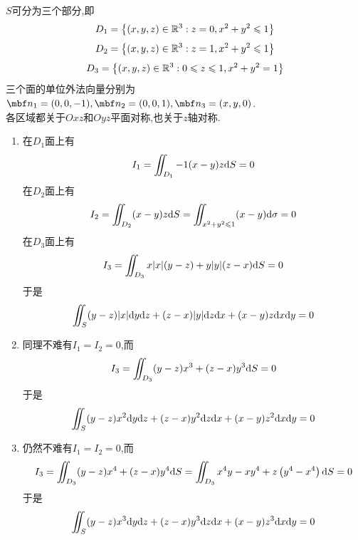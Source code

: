 \documentclass{ctexart}
\begin{document}
\begin{solution}
    $S$可分为三个部分,即
    \[D_1=\left\{(x,y,z)\in\mathbb{R}^3:z=0,x^2+y^2\leqslant1\right\}\]
    \[D_2=\left\{(x,y,z)\in\mathbb{R}^3:z=1,x^2+y^2\leqslant1\right\}\]
    \[D_3=\left\{(x,y,z)\in\mathbb{R}^3:0\leqslant z\leqslant 1,x^2+y^2=1\right\}\]
    三个面的单位外法向量分别为$\mbf n_1=(0,0,-1),\mbf n_2=(0,0,1),\mbf n_3=(x,y,0)$.\\
    各区域都关于$Oxz$和$Oyz$平面对称,也关于$z$轴对称.
    \begin{enumerate}[label=\tbf{(\arabic*)}]
        \item 在$D_1$面上有
            \[I_1=\iint_{D_1}-1(x-y)z\mathrm{d} S=0\]
            在$D_2$面上有
            \[I_2=\iint_{D_2}(x-y)z\mathrm{d} S=\iint_{x^2+y^2\leqslant 1}(x-y)\mathrm{d}\sigma=0\]
            在$D_3$面上有
            \[I_3=\iint_{D_3}x|x|(y-z)+y|y|(z-x)\mathrm{d} S=0\]
            于是
            \[\iint_S(y-z)|x|\mathrm{d} y\mathrm{d} z+(z-x)|y|\mathrm{d} z\mathrm{d} x+(x-y)z\mathrm{d} x\mathrm{d} y=0\]
        \item 同理不难有$I_1=I_2=0$,而
            \[I_3=\iint_{D_3}(y-z)x^3+(z-x)y^3\mathrm{d} S=0\]
            于是
            \[\iint_S(y-z)x^2\mathrm{d} y\mathrm{d} z+(z-x)y^2\mathrm{d} z\mathrm{d} x+(x-y)z^2\mathrm{d} x\mathrm{d} y=0\]
        \item 仍然不难有$I_1=I_2=0$,而
            \[I_3=\iint_{D_3}(y-z)x^4+(z-x)y^4\mathrm{d} S=\iint_{D_3}x^4y-xy^4+z\left(y^4-x^4\right)\mathrm{d} S=0\]
            于是
            \[\iint_S(y-z)x^3\mathrm{d} y\mathrm{d} z+(z-x)y^3\mathrm{d} z\mathrm{d} x+(x-y)z^3\mathrm{d} x\mathrm{d} y=0\]
    \end{enumerate}
\end{solution}
\end{document}
